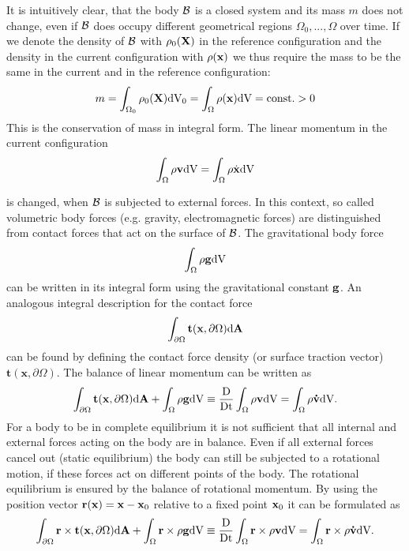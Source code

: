 It is intuitively clear, that the body $\mathcal{B} $ is a closed system and its mass $m$ does not change, even if $\mathcal{B} $ does occupy different geometrical regions $\Omega_0, ..., \Omega$ over time. If we denote the density of $\mathcal{B} $ with $\rho _0(\mathbf {X} )$ in the reference configuration and the density in the current configuration with $\rho (\mathbf {x} )$ we thus require the mass to be the same in the current and in the reference configuration:
 \begin{equation}
m = \int _{\Omega_0} \rho _0(\mathbf {X} )  \textnormal{dV}_0 = \int _{\Omega} \rho (\mathbf {x} )  \textnormal{dV} = \textnormal{const.}>0
\label{MassConservation}
\end{equation}
This is the conservation of mass in integral form. The linear momentum in the current configuration
 \begin{equation}
\int _{\Omega} \rho \mathbf {v}   \textnormal{dV} = \int _{\Omega} \rho \dot {\mathbf {x} }  \textnormal{dV}
\label{LinearMomentum}
\end{equation}

is changed, when $\mathcal{B} $ is subjected to external forces. In this context, so called volumetric body forces (e.g. gravity, electromagnetic forces) are distinguished from contact forces that act on the surface of $\mathcal{B} $. The gravitational body force 
 \begin{equation}
\int _{\Omega} \rho \mathbf {g}   \textnormal{dV} 
\label{GravitationalForce}
\end{equation}
 can be written in its integral form using the gravitational constant $\mathbf {g} $. An analogous integral description for the contact force
 \begin{equation}
\int_{\partial \Omega}  \mathbf {t}  ( \mathbf {x} , \partial \Omega)  \textnormal{d}\mathbf{A}
\label{ContactForce}
\end{equation}
can be found by defining the contact force density (or surface traction vector) $\mathbf{t} (\mathbf x, \partial \Omega)$. The balance of linear momentum can be written as
 \begin{equation}
\int_{\partial \Omega}  \mathbf {t}  (\mathbf {x} , \partial \Omega)  \textnormal{d}\mathbf{A} + \int_{\Omega}   \rho \mathbf {g}   \textnormal{dV}  \equiv  \frac{\textnormal{D}}{\textnormal{Dt}} \int _{\Omega} \rho \mathbf {v}   \textnormal{dV}  = \int _{\Omega} \rho \mathbf {\dot v}   \textnormal{dV}. 
\label{BalanceLinearMomentum}
\end{equation}
 For a body to be in complete equilibrium it is not sufficient that all internal and external forces acting on the body are in balance. Even if all external forces cancel out (static equilibrium) the body can still be subjected to a rotational motion, if these forces act on different points of the body. The rotational equilibrium is ensured by the balance of rotational momentum. By using the position vector $\mathbf r (\mathbf {x} ) = \mathbf {x}  - \mathbf {x}  _0$ relative to a fixed point $\mathbf {x} _0$ it can be formulated as
 \begin{equation}
\int_{\partial \Omega}  \mathbf r \times \mathbf{t} (\mathbf x, \partial \Omega)  \textnormal{d}\mathbf{A} + \int_{\Omega}   \mathbf r \times  \rho \mathbf {g}   \textnormal{dV}  \equiv  \frac{\textnormal{D}}{\textnormal{Dt}} \int _{\Omega}  \mathbf r \times  \rho \mathbf v  \textnormal{dV}  = \int _{\Omega}  \mathbf r \times  \rho \mathbf{  \dot{v}}  \textnormal{dV}.
\label{BalanceRotationalMomentum}
\end{equation}




